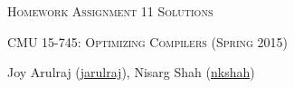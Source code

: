 \documentclass[letterpaper]{article}
\makeatletter
\def \issoln {1}
\newcommand{\email}[1]{\href{mailto:#1@cs.cmu.edu}{#1}}
\makeatother
\begin{document}
\section*{}
\begin{center}
  \centerline{\textsc{\LARGE Homework Assignment 1{\if\issoln 1 Solutions \else \fi}}}
  \vspace{1em}
  \textsc{\large CMU 15-745: Optimizing Compilers (Spring 2015)} \\
  \vspace{3em}
  \centerline{\large{Joy Arulraj (\email{jarulraj}), Nisarg Shah (\email{nkshah})}}
  \vspace{1em}
\end{center}





\end{document}
